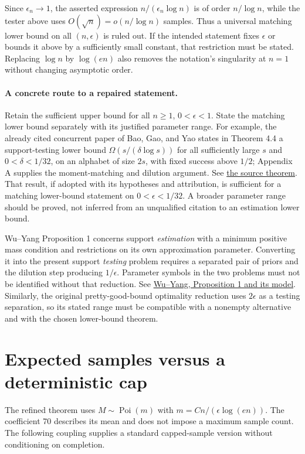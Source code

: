 \documentclass[11pt]{article}
\begin{document}
Since $\epsilon_n\to1$, the asserted expression
$n/(\epsilon_n\log n)$ is of order $n/\log n$, while the tester above
uses $O(\sqrt n)=o(n/\log n)$ samples. Thus a universal matching lower
bound on all $(n,\epsilon)$ is ruled out. If the intended statement fixes
$\epsilon$ or bounds it above by a sufficiently small constant, that
restriction must be stated. Replacing $\log n$ by $\log(en)$ also removes
the notation's singularity at $n=1$ without changing asymptotic order.

\paragraph{A concrete route to a repaired statement.}
Retain the sufficient upper bound for all $n\ge1$, $0<\epsilon<1$.
State the matching lower bound separately with its justified parameter
range. For example, the already cited concurrent paper of Bao, Gao, and
Yao states in Theorem 4.4 a support-testing lower bound
$\Omega(s/(\delta\log s))$ for all sufficiently large $s$ and
$0<\delta<1/32$, on an alphabet of size $2s$, with fixed success above
$1/2$; Appendix A supplies the moment-matching and dilution argument.
See \href{https://arxiv.org/html/2609.37926v1#S4.SS1}{the source theorem}.
That result, if adopted with its hypotheses and attribution, is sufficient
for a matching lower-bound statement on $0<\epsilon<1/32$.
A broader parameter range should be proved, not inferred from an
unqualified citation to an estimation lower bound.

Wu--Yang Proposition 1 concerns support \emph{estimation} with a minimum
positive mass condition and restrictions on its own approximation
parameter. Converting it into the present support \emph{testing} problem
requires a separated pair of priors and the dilution step producing
$1/\epsilon$. Parameter symbols in the two problems must not be identified
without that reduction. See
\href{https://arxiv.org/pdf/1504.01227}{Wu--Yang, Proposition 1 and its model}.
Similarly, the original pretty-good-bound optimality reduction uses
$2\epsilon$ as a testing separation, so its stated range must be compatible
with a nonempty alternative and with the chosen lower-bound theorem.

\section{Expected samples versus a deterministic cap}
The refined theorem uses $M\sim\operatorname{Poi}(m)$ with
$m=Cn/(\epsilon\log(en))$. The coefficient 70 describes its mean and
does not impose a maximum sample count. The following coupling supplies
a standard capped-sample version without conditioning on completion.
\end{document}

